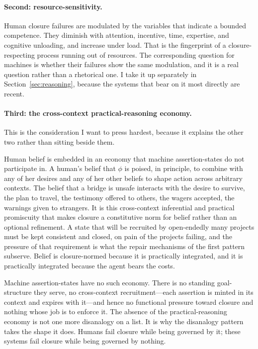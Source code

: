 \paragraph{Second: resource-sensitivity.} Human closure failures are modulated by
the variables that indicate a bounded competence. They diminish with attention,
incentive, time, expertise, and cognitive unloading, and increase under load.
That is the fingerprint of a closure-respecting process running out of resources.
The corresponding question for machines is whether their failures show the same
modulation, and it is a real question rather than a rhetorical one. I take it up
separately in Section~\ref{sec:reasoning}, because the systems that bear on it
most directly are recent.

\paragraph{Third: the cross-context practical-reasoning economy.} This is the
consideration I want to press hardest, because it explains the other two rather
than sitting beside them.

Human belief is embedded in an economy that machine assertion-states do not
participate in. A human's belief that $\phi$ is poised, in principle, to combine
with any of her desires and any of her other beliefs to shape action across
arbitrary contexts. The belief that a bridge is unsafe interacts with the desire
to survive, the plan to travel, the testimony offered to others, the wagers
accepted, the warnings given to strangers. It is this cross-context inferential
and practical promiscuity that makes closure a constitutive norm for belief rather
than an optional refinement. A state that will be recruited by open-endedly many
projects must be kept consistent and closed, on pain of the projects failing, and
the pressure of that requirement is what the repair mechanisms of the first
pattern subserve. Belief is closure-normed because it is practically integrated,
and it is practically integrated because the agent bears the costs.

Machine assertion-states have no such economy. There is no standing goal-structure
they serve, no cross-context recruitment---each assertion is minted in its context
and expires with it---and hence no functional pressure toward closure and nothing
whose job is to enforce it. The absence of the practical-reasoning economy is not
one more disanalogy on a list. It is why the disanalogy pattern takes the shape it
does. Humans fail closure while being governed by it; these systems fail closure
while being governed by nothing.

